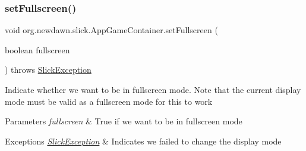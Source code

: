 \subsubsection{\texorpdfstring{set\+Fullscreen()}{setFullscreen()}}
{\footnotesize\ttfamily void org.\+newdawn.\+slick.\+App\+Game\+Container.\+set\+Fullscreen (\begin{DoxyParamCaption}\item[{boolean}]{fullscreen }\end{DoxyParamCaption}) throws \mbox{\hyperlink{classorg_1_1newdawn_1_1slick_1_1_slick_exception}{Slick\+Exception}}\hspace{0.3cm}{\ttfamily [inline]}}

Indicate whether we want to be in fullscreen mode. Note that the current display mode must be valid as a fullscreen mode for this to work


\begin{DoxyParams}{Parameters}
{\em fullscreen} & True if we want to be in fullscreen mode \\
\hline
\end{DoxyParams}

\begin{DoxyExceptions}{Exceptions}
{\em \mbox{\hyperlink{classorg_1_1newdawn_1_1slick_1_1_slick_exception}{Slick\+Exception}}} & Indicates we failed to change the display mode \\
\hline
\end{DoxyExceptions}

